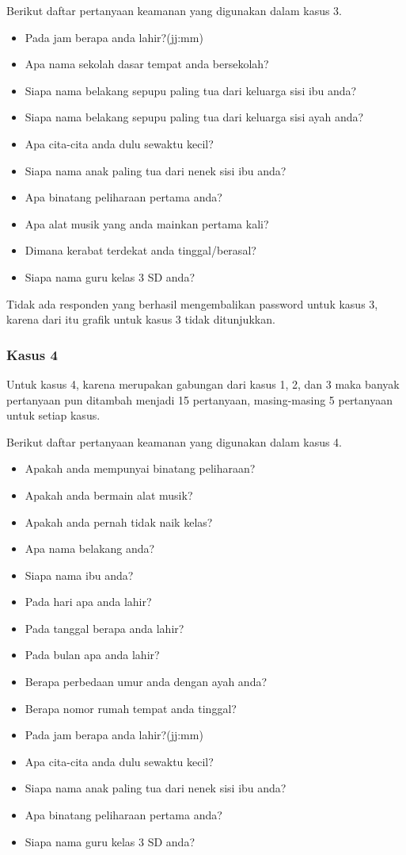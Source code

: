 Berikut daftar pertanyaan keamanan yang digunakan dalam kasus 3.
\begin{itemize}
	\item Pada jam berapa anda lahir?(jj:mm)
	\item Apa nama sekolah dasar tempat anda bersekolah?
	\item Siapa nama belakang sepupu paling tua dari keluarga sisi ibu anda?
	\item Siapa nama belakang sepupu paling tua dari keluarga sisi ayah anda?
	\item Apa cita-cita anda dulu sewaktu kecil?
	\item Siapa nama anak paling tua dari nenek sisi ibu anda?
	\item Apa binatang peliharaan pertama anda?
	\item Apa alat musik yang anda mainkan pertama kali?
	\item Dimana kerabat terdekat anda tinggal/berasal?
	\item Siapa nama guru kelas 3 SD anda?
\end{itemize}

Tidak ada responden yang berhasil mengembalikan password untuk kasus 3, karena dari itu grafik untuk kasus 3 tidak ditunjukkan.

\subsubsection{Kasus 4}

Untuk kasus 4, karena merupakan gabungan dari kasus 1, 2, dan 3 maka banyak pertanyaan pun ditambah menjadi 15 pertanyaan, masing-masing 5 pertanyaan untuk setiap kasus.

Berikut daftar pertanyaan keamanan yang digunakan dalam kasus 4.
\begin{itemize}
	\item Apakah anda mempunyai binatang peliharaan?
	\item Apakah anda bermain alat musik?
	\item Apakah anda pernah tidak naik kelas?
	\item Apa nama belakang anda?
	\item Siapa nama ibu anda?
	\item Pada hari apa anda lahir?
	\item Pada tanggal berapa anda lahir?
	\item Pada bulan apa anda lahir?
	\item Berapa perbedaan umur anda dengan ayah anda?
	\item Berapa nomor rumah tempat anda tinggal?
	\item Pada jam berapa anda lahir?(jj:mm)
	\item Apa cita-cita anda dulu sewaktu kecil?
	\item Siapa nama anak paling tua dari nenek sisi ibu anda?
	\item Apa binatang peliharaan pertama anda?
	\item Siapa nama guru kelas 3 SD anda?
\end{itemize}


